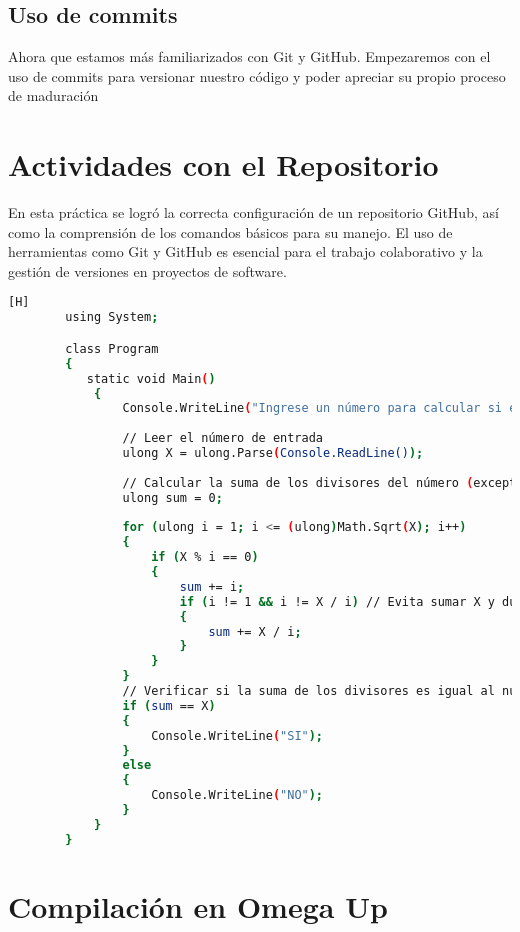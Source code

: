 \documentclass{article}
\begin{document}
    \subsection{Uso de commits}
    Ahora que estamos más familiarizados con Git y GitHub. Empezaremos con el uso de commits para versionar nuestro código y poder apreciar su propio proceso de maduración
    
	\section{Actividades con el Repositorio}
	En esta práctica se logró la correcta configuración de un repositorio GitHub, así como la comprensión de los comandos básicos para su manejo. El uso de herramientas como Git y GitHub es esencial para el trabajo colaborativo y la gestión de versiones en proyectos de software.
    
	\clearpage
	
	
    \begin{lstlisting}[language=bash,caption={Código}][H]
        using System;

        class Program
        {
           static void Main()
            {
                Console.WriteLine("Ingrese un número para calcular si es perfecto:");
                
                // Leer el número de entrada
                ulong X = ulong.Parse(Console.ReadLine());
        
                // Calcular la suma de los divisores del número (excepto el mismo)
                ulong sum = 0;
                
                for (ulong i = 1; i <= (ulong)Math.Sqrt(X); i++)
                {
                    if (X % i == 0)
                    {
                        sum += i;
                        if (i != 1 && i != X / i) // Evita sumar X y duplicar i cuando es el mismo divisor
                        {
                            sum += X / i;
                        }
                    }
                }
                // Verificar si la suma de los divisores es igual al número
                if (sum == X)
                {
                    Console.WriteLine("SI");
                }
                else
                {
                    Console.WriteLine("NO");
                }
            }
        }
    \end{lstlisting}
	\section{Compilación en Omega Up}
\end{document}
